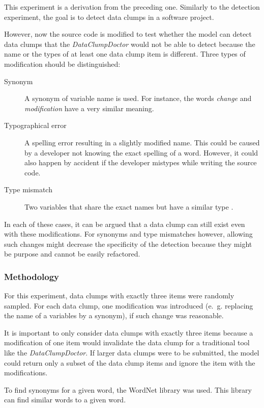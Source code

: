 This experiment is a derivation from the preceding one. Similarly to the detection experiment, the goal is to detect data clumps in a software project.

However, now the source code is modified to test whether the model can detect data clumps that the \textit{DataClumpDoctor} would not be able to detect because the name or the types of at least one data clump item is different. Three types of modification should be distinguished:

\begin{description}
    \item[Synonym] A synonym of variable name is used. For instance, the words \textit{change} and \textit{modification} have a very similar  meaning. 

    \item[ Typographical error] A spelling error resulting in a slightly modified name. This could be caused by a developer not knowing the exact spelling of a word. However, it could also happen by accident if the developer mistypes while writing the source code.

    \item [Type mismatch] Two variables that share the exact names but have a similar type .
\end{description}

In each of these cases, it can be argued that a data clump can still exist even with these modifications. For synonyms and type mismatches however, allowing such changes might decrease the specificity of the detection because they might be purpose and cannot be easily refactored. 

\subsubsection{Methodology}

For this experiment, data clumps with exactly three items were randomly sampled. For each data clump, one modification was introduced (e.~g. replacing the name of a variables by a synonym), if such change was reasonable.

It is important to only consider data clumps with exactly three items because  a modification of one item would invalidate the data clump for a traditional tool like the \textit{DataClumpDoctor}. If larger data clumps were to be submitted, the model could return only a subset of the data clump items and ignore the item with the modifications. 

To find synonyms for a given word, the WordNet \cite{10.7551/mitpress/7287.001.0001} library was used. This library can find similar words to a given word.

